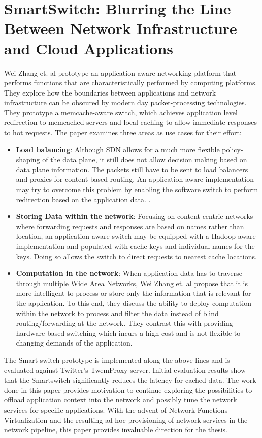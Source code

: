 \section{SmartSwitch: Blurring the Line Between Network Infrastructure and Cloud Applications}
Wei Zhang et. al \cite{zhang2014smartswitch} prototype an application-aware networking platform that performs functions that are characteristically performed by computing platforms. They explore how the boundaries between applications and network infrastructure can be obscured by modern day packet-processing technologies.  They prototype a memcache-aware switch, which achieves application level redirection to memcached servers and local caching to allow immediate responses to hot requests. The paper examines three areas as use cases for their effort:
\begin{itemize}

 \item  \textbf{Load balancing}: Although SDN allows for a much more flexible policy-shaping of the data plane, it still does not allow decision making based on data plane information. The packets still have to be sent to load balancers and proxies for content based routing. An application-aware implementation may try to overcome this problem by enabling the software switch to perform redirection based on the application data.
.
 \item  \textbf{Storing Data within the network}: Focusing on content-centric networks where forwarding requests and responses are based on names rather than location, an application aware switch may be equipped with a Hadoop-aware implementation and populated with cache keys and individual names for the keys. Doing so allows the switch to direct requests to nearest cache locations.

 \item  \textbf{Computation in the network}: When application data has to traverse through multiple Wide Area Networks, Wei Zhang et. al propose that it is more intelligent to process or store only the information that is relevant for the application. To this end, they discuss the ability to deploy computation within the network to process and filter the data instead of blind routing/forwarding at the network. They contrast this with providing hardware based switching which incurs a high cost and is not flexible to changing demands of the application.

\end{itemize}
The Smart switch prototype is implemented along the above lines and is evaluated against Twitter's TwemProxy server. Initial evaluation results show that the Smartswitch significantly reduces the latency for cached data. The work done in this paper provides motivation to continue exploring the possibilities to offload application context into the network and possibly tune the network services for specific applications. With the advent of Network Functions Virtualization and the resulting ad-hoc provisioning of network services in the network pipeline, this paper provides invaluable direction for the thesis. 

